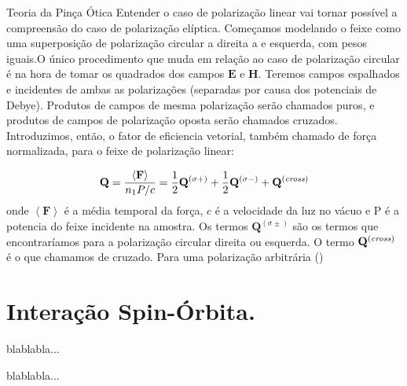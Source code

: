 \begin{chapter}{Teoria da Pinça Ótica}
Entender o caso de polarização linear vai tornar possível a compreensão do caso de polarização elíptica. Começamos modelando o feixe como uma superposição de polarização circular a direita a e esquerda, com pesos iguais.O único procedimento que muda em relação ao caso de polarização circular é na hora de tomar os quadrados dos campos ${\mathbf E}$ e ${\mathbf H}$. Teremos campos espalhados e incidentes de ambas as polarizações (separadas por causa dos potenciais de Debye). Produtos de campos de mesma polarização serão chamados puros, e produtos de campos de polarização oposta serão chamados cruzados. Introduzimos, então, o fator de eficiencia vetorial, também chamado de força normalizada, para o feixe de polarização linear:

\begin{equation}
{\mathbf Q} = \frac{\left<{\mathbf F}\right>}{n_1 P/c}= \frac{1}{2}{\mathbf Q}^{(\sigma +)} + \frac{1}{2}{\mathbf Q}^{(\sigma -)} + {\mathbf Q}^{({\it cross})}
\end{equation}
%
onde $\left<{\mathbf F}\right>$ é a média temporal da força, $c$ é a velocidade da luz no vácuo e P é a potencia do feixe incidente na amostra. Os termos ${\mathbf Q}^{(\sigma \pm)}$ são os termos que encontraríamos para a polarização circular direita ou esquerda. O termo ${\mathbf Q}^{({\it cross})}$ é o que chamamos de cruzado. Para uma polarização arbitrária ()

\section{Interação Spin-Órbita.}
blablabla...

blablabla...

\end{chapter}
